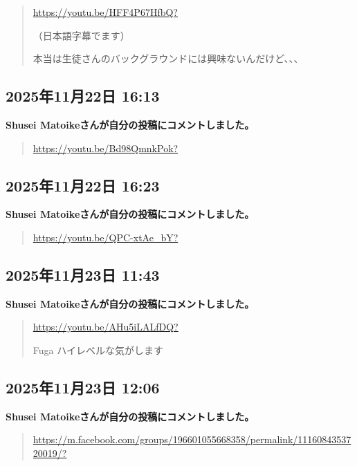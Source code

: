 \begin{quote}
\url{https://youtu.be/HFF4P67HfbQ?}

（日本語字幕でます）

本当は生徒さんのバックグラウンドには興味ないんだけど、、、
\end{quote}

\subsection*{2025年11月22日 16:13}

\textbf{Shusei Matoikeさんが自分の投稿にコメントしました。}

\begin{quote}
\url{https://youtu.be/Bd98QmnkPok?}
\end{quote}

\subsection*{2025年11月22日 16:23}

\textbf{Shusei Matoikeさんが自分の投稿にコメントしました。}

\begin{quote}
\url{https://youtu.be/QPC-xtAe_bY?}
\end{quote}

\subsection*{2025年11月23日 11:43}

\textbf{Shusei Matoikeさんが自分の投稿にコメントしました。}

\begin{quote}
\url{https://youtu.be/AHu5iLALfDQ?}

Fuga ハイレベルな気がします
\end{quote}

\subsection*{2025年11月23日 12:06}

\textbf{Shusei Matoikeさんが自分の投稿にコメントしました。}

\begin{quote}
\url{https://m.facebook.com/groups/196601055668358/permalink/1116084353720019/?}
\end{quote}

